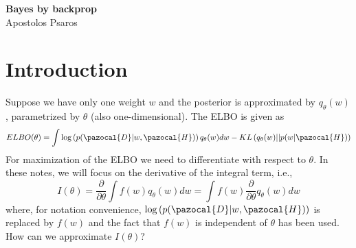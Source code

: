 

\newcommand{\bw}{\boldsymbol{w}}
\newcommand{\bp}{\boldsymbol{p}}
\newcommand{\bth}{\boldsymbol{\theta}}
\newcommand{\bA}{\boldsymbol{A}}
\newcommand{\cH}{\pazocal{H}}
\newcommand{\cN}{\pazocal{N}}
\newcommand{\cP}{\pazocal{P}}
\newcommand{\cD}{\pazocal{D}}
\newcommand{\cO}{\pazocal{O}}
\newcommand{\cL}{\pazocal{L}}


\setcounter{tocdepth}{3}

	
	\sloppy
	
	\begin{center}	
		\Large
		\textbf{Bayes by backprop}\\
		\large
		Apostolos Psaros\\	
	\end{center}
	\vskip 0.25in
	


\section{Introduction}\label{sec:introduction}
Suppose we have only one weight $w$ and the posterior is approximated by $q_{\theta}(w)$, parametrized by $\theta$ (also one-dimensional).
The ELBO is given as
\begin{equation}\label{ELBO_2}
ELBO(\theta) = \int \log\left(p(\cD|w,\cH)\right)q_{\theta}(w) dw - KL\left(q_{\theta}(w)||p(w|\cH)\right)
\end{equation}
For maximization of the ELBO we need to differentiate with respect to $\theta$. 
In these notes, we will focus on the derivative of the integral term, i.e., 
\begin{equation}\label{integral}
I(\theta) = \frac{\partial}{\partial \theta} \int f(w)q_{\theta}(w)dw=
\int f(w)\frac{\partial}{\partial \theta} q_{\theta}(w)dw
\end{equation}
where, for notation convenience, $\log\left(p(\cD|w,\cH)\right)$ is replaced by $f(w)$ and the fact that $f(w)$ is independent of $\theta$ has been used. 
How can we approximate $I(\theta)$?

